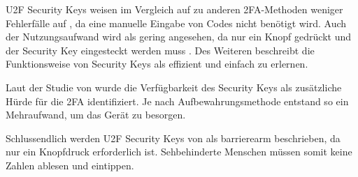 \ac{U2F} Security Keys weisen im Vergleich auf zu anderen \ac{2FA}-Methoden weniger Fehlerfälle auf \parencite{langSecurityKeys2017}, da eine manuelle Eingabe von Codes nicht benötigt wird. Auch der Nutzungsaufwand wird als gering angesehen, da nur ein Knopf gedrückt und der Security Key eingesteckt werden muss \parencite{langSecurityKeys2017}. Des Weiteren beschreibt \textcite{langSecurityKeys2017} die Funktionsweise von Security Keys als effizient und einfach zu erlernen.

Laut der Studie von \textcite{reeseUsabilityStudy2019} wurde die Verfügbarkeit des Security Keys als zusätzliche Hürde für die \ac{2FA} identifiziert. Je nach Aufbewahrungsmethode entstand so ein Mehraufwand, um das Gerät zu besorgen.

Schlussendlich werden \ac{U2F} Security Keys von \textcite{langSecurityKeys2017} als barrierearm beschrieben, da nur ein Knopfdruck erforderlich ist. Sehbehinderte Menschen müssen somit keine Zahlen ablesen und eintippen.
